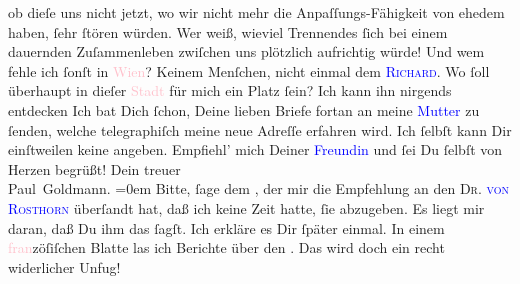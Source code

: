                ob dieſe uns nicht jetzt, wo wir nicht mehr die
               Anpaſſungs-Fähigkeit von ehedem haben, ſehr ſtören  würden. Wer weiß,  wieviel
               Trennendes ſich bei einem dauernden Zuſammenleben zwiſchen uns plötzlich aufrichtig
               würde! Und wem fehle ich ſonſt in \textcolor{pink}{Wien}{}\ledrightnote{\textcolor{pink}{Wien}}? Keinem
               Menſchen, nicht einmal dem \textsc{\textcolor{blue}{Richard}{}\ledrightnote{\textcolor{blue}{Richard Beer-Hofmann}}}. Wo ſoll überhaupt in dieſer \textcolor{pink}{Stadt}{} für mich ein Platz ſein? Ich kann ihn nirgends entdecken{\dotsfive}\pend
           \pstart
           Ich  bat Dich ſchon, Deine {\pb}lieben Briefe fortan an meine \textcolor{blue}{Mutter}{} zu ſenden, welche telegraphiſch
               meine neue Adreſſe erfahren wird. Ich ſelbſt kann Dir einſtweilen keine angeben.\pend
           \pstart
           Empfiehl’ mich Deiner \textcolor{blue}{Freundin}{} und ſei Du ſelbſt von Herzen begrüßt!\pend
           \pstart
           Dein treuer {\\[\baselineskip]}\spacefill\mbox{Paul Goldmann.}\pend
           \leftskip=0em{}\pstart
           \noindent{}Bitte, ſage dem \label{K_L02861-67v}\label{K_L02861-67h}, der mir die Empfehlung an den \textsc{Dr. 
                     \textcolor{blue}{von Rosthorn}{}\ledrightnote{\textcolor{blue}{Arthur Rosthorn}}} überſandt hat, daß ich keine Zeit hatte, ſie abzugeben. Es liegt mir daran,
                  daß Du ihm das ſagſt. Ich erkläre es Dir ſpäter einmal.\pend
           \pstart
           In einem 
                  \textcolor{pink}{fran}{}zöſiſchen Blatte las ich Berichte
                  über den \label{K_L02861-11v}\label{K_L02861-11h}. Das wird doch ein recht
                  widerlicher Unfug!\pend
           \endnumbering{}\begin{anhang}\end{anhang}
      